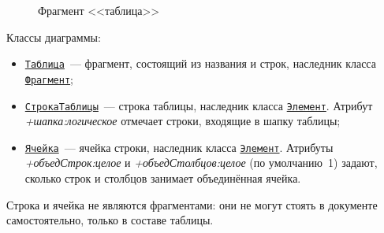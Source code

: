\begin{figure}
	\caption{Фрагмент <<таблица>>}%
	\label{fig:UMLtable}
\end{figure}

Классы диаграммы:
\begin{itemize}
	\item \hyperref[fig:UMLtable]{\Verb|Таблица|}~--- фрагмент, состоящий из названия и строк, наследник класса \hyperref[fig:UMLdoc]{\Verb|Фрагмент|};
	\item \hyperref[fig:UMLtable]{\Verb|СтрокаТаблицы|}~--- строка таблицы, наследник класса \hyperref[fig:UMLroot]{\Verb|Элемент|}. Атрибут \textit{+шапка:логическое} отмечает строки, входящие в шапку таблицы;
	\item \hyperref[fig:UMLtable]{\Verb|Ячейка|}~--- ячейка строки, наследник класса \hyperref[fig:UMLroot]{\Verb|Элемент|}. Атрибуты \textit{+объедСтрок:целое} и \textit{+объедСтолбцов:целое} (по умолчанию~1) задают, сколько строк и столбцов занимает объединённая ячейка.
\end{itemize}

Строка и ячейка не являются фрагментами: они не могут стоять в документе самостоятельно, только в составе таблицы.

